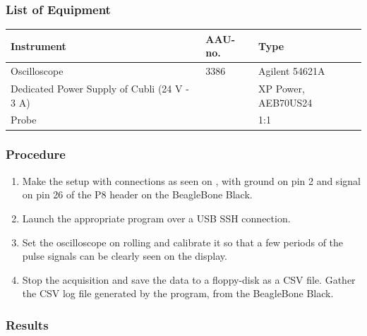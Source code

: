 \subsubsection{List of Equipment}
\begin{table}[H]
  \begin{tabular}{|l|l|p{4.3cm}|}
    \hline%
    \textbf{Instrument}                                   &  \textbf{AAU-no.} &  \textbf{Type}            \\
    \hline%
    Oscilloscope                                          &  3386             &  Agilent 54621A           \\
    \hline%
    Dedicated Power Supply of Cubli \small{(24 V - 3 A)}  &                   &  XP Power, AEB70US24      \\
    \hline%
    Probe                                                 &                   &  1:1                      \\
    \hline%
  \end{tabular}
\end{table}

\subsubsection{Procedure}
\begin{enumerate}
  \item Make the setup with connections as seen on , with ground on pin 2 and signal on pin 26 of the P8 header on the BeagleBone Black.
  \item Launch the appropriate program over a USB SSH connection.
  \item Set the oscilloscope on rolling and calibrate it so that a few periods of the pulse signals can be clearly seen on the display.
  \item Stop the acquisition and save the data to a floppy-disk as a CSV file. Gather the CSV log file generated by the program, from the BeagleBone Black.
\end{enumerate}

\subsubsection{Results}
